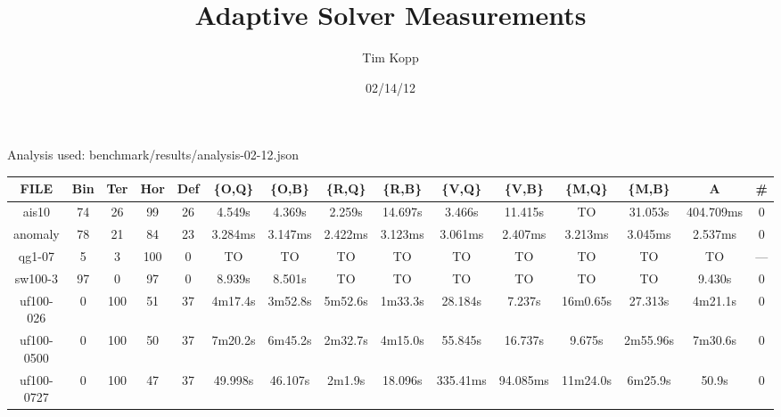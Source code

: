 \documentclass{article}
\title{Adaptive Solver Measurements}
\author{Tim Kopp}
\date{02/14/12}
\begin{document}
\maketitle

Analysis used: benchmark/results/analysis-02-12.json

\begin{table}[ht!]
\centering
\begin{tabular}{|c||c|c|c|c||c|c|c|c|c|c|c|c||c|c|}\hline
FILE & Bin & Ter & Hor & Def & \{O,Q\} & \{O,B\} & \{R,Q\} & \{R,B\} & \{V,Q\} & \{V,B\} & \{M,Q\} & \{M,B\} & A & \#\\\hline\hline
ais10 & 74 & 26 & 99 & 26 & 4.549s & 4.369s & 2.259s & 14.697s & 3.466s & 11.415s & TO & 31.053s & 404.709ms & 0\\\hline
anomaly & 78 & 21 & 84 & 23 & 3.284ms & 3.147ms & 2.422ms & 3.123ms & 3.061ms & 2.407ms & 3.213ms & 3.045ms & 2.537ms & 0\\\hline
qg1-07 & 5 & 3 & 100 & 0 & TO & TO & TO & TO & TO & TO & TO & TO & TO & --- \\\hline
sw100-3 & 97 & 0 & 97 & 0 & 8.939s & 8.501s & TO & TO & TO & TO & TO & TO & 9.430s & 0\\\hline
uf100-026 & 0 & 100 & 51 & 37 & 4m17.4s & 3m52.8s & 5m52.6s & 1m33.3s & 28.184s & 7.237s & 16m0.65s & 27.313s & 4m21.1s & 0\\\hline
uf100-0500 & 0 & 100 & 50 & 37 & 7m20.2s & 6m45.2s & 2m32.7s & 4m15.0s & 55.845s & 16.737s & 9.675s & 2m55.96s & 7m30.6s & 0\\\hline
uf100-0727 & 0 & 100 & 47 & 37 & 49.998s & 46.107s & 2m1.9s & 18.096s & 335.41ms & 94.085ms & 11m24.0s & 6m25.9s & 50.9s & 0\\\hline
\end{tabular}
\end{table}
\end{document}
